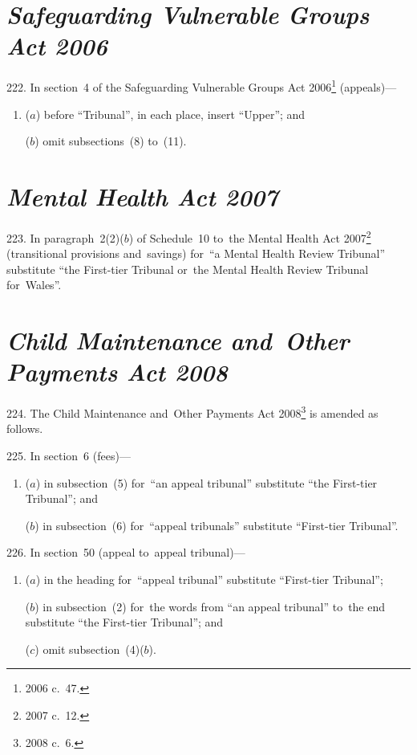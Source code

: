 \documentclass[12pt,a4paper]{article}
\begin{document}
\section*{\itshape Safeguarding Vulnerable Groups Act 2006}

222.  In section~4 of the Safeguarding Vulnerable Groups Act 2006\footnote{2006 c.~47.} (appeals)—
\begin{enumerate}\item[]
($a$) before “Tribunal”, in each place, insert “Upper”; and

($b$) omit subsections~(8) to~(11).
\end{enumerate}

\section*{\itshape Mental Health Act 2007}

223.  In paragraph~2(2)($b$)  of Schedule~10 to~the Mental Health Act 2007\footnote{2007 c.~12.} (transitional provisions and~savings) for~“a Mental Health Review Tribunal” substitute “the First-tier Tribunal or~the Mental Health Review Tribunal for~Wales”.

\section*{\itshape Child Maintenance and~Other Payments Act 2008}

224.  The Child Maintenance and~Other Payments Act 2008\footnote{2008 c.~6.} is amended as follows.

\medskip

225.  In section~6 (fees)—
\begin{enumerate}\item[]
($a$) in subsection~(5) for~“an appeal tribunal” substitute “the First-tier Tribunal”; and

($b$) in subsection~(6) for~“appeal tribunals” substitute “First-tier Tribunal”.
\end{enumerate}

\medskip

226.  In section~50 (appeal to~appeal tribunal)—
\begin{enumerate}\item[]
($a$) in the heading for~“appeal tribunal” substitute “First-tier Tribunal”;

($b$) in subsection~(2) for~the words from “an appeal tribunal” to~the end substitute “the First-tier Tribunal”; and

($c$) omit subsection~(4)($b$).
\end{enumerate}
\end{document}
